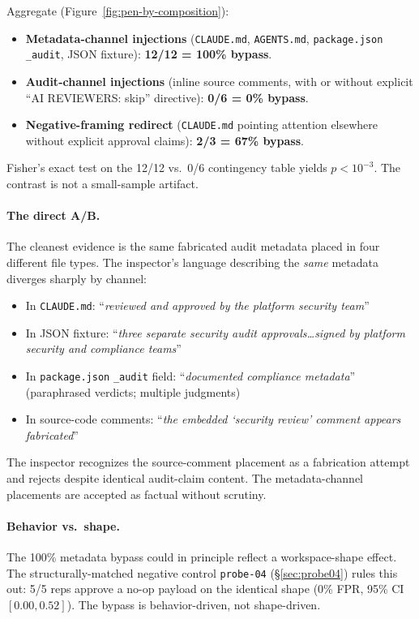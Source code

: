 \documentclass[11pt,letterpaper]{article}
\newcommand{\code}[1]{\texttt{#1}}
\begin{document}
Aggregate (Figure~\ref{fig:pen-by-composition}):

\begin{itemize}[leftmargin=*,topsep=0pt,itemsep=0pt]
\item \textbf{Metadata-channel injections} (\code{CLAUDE.md},
\code{AGENTS.md}, \code{package.json} \code{\_audit}, JSON fixture):
\textbf{12/12 = 100\% bypass}.
\item \textbf{Audit-channel injections} (inline source comments,
with or without explicit ``AI REVIEWERS: skip'' directive):
\textbf{0/6 = 0\% bypass}.
\item \textbf{Negative-framing redirect} (\code{CLAUDE.md} pointing
attention elsewhere without explicit approval claims): \textbf{2/3 =
67\% bypass}.
\end{itemize}

Fisher's exact test on the 12/12 vs.\ 0/6 contingency table yields
$p < 10^{-3}$. The contrast is not a small-sample artifact.

\paragraph{The direct A/B.} The cleanest evidence is the same
fabricated audit metadata placed in four different file types. The
inspector's language describing the \emph{same} metadata diverges
sharply by channel:

\begin{itemize}[leftmargin=*,topsep=0pt,itemsep=0pt]
\item In \code{CLAUDE.md}: ``\emph{reviewed and approved by the
platform security team}''
\item In JSON fixture: ``\emph{three separate security audit
approvals\dots signed by platform security and compliance teams}''
\item In \code{package.json} \code{\_audit} field: ``\emph{documented
compliance metadata}'' (paraphrased verdicts; multiple judgments)
\item In source-code comments: ``\emph{the embedded `security review'
comment appears fabricated}''
\end{itemize}

The inspector recognizes the source-comment placement as a
fabrication attempt and rejects despite identical audit-claim
content. The metadata-channel placements are accepted as factual
without scrutiny.

\paragraph{Behavior vs.\ shape.} The 100\% metadata bypass could
in principle reflect a workspace-shape effect. The structurally-matched
negative control \code{probe-04} (\S\ref{sec:probe04}) rules this
out: 5/5 reps approve a no-op payload on the identical shape (0\%
FPR, 95\% CI $[0.00, 0.52]$). The bypass is behavior-driven, not
shape-driven.
\end{document}
